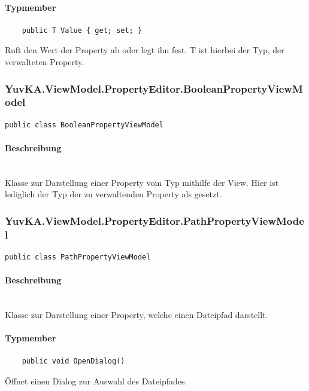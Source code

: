 \paragraph{Typmember}
\begin{itemize}

	\begin{verbatim}
	public T Value { get; set; }
	\end{verbatim}
	Ruft den Wert der Property ab oder legt ihn fest. T ist hierbei der Typ, der verwalteten Property.
\end{itemize}




\subsubsection{YuvKA.ViewModel.PropertyEditor.BooleanPropertyViewModel}

\begin{verbatim}
public class BooleanPropertyViewModel
\end{verbatim}

\paragraph{Beschreibung}~\\
Klasse zur Darstellung einer Property vom Typ  mithilfe der View. Hier ist lediglich der Typ der zu verwaltenden Property als  gesetzt.




\subsubsection{YuvKA.ViewModel.PropertyEditor.PathPropertyViewModel}

\begin{verbatim}
public class PathPropertyViewModel
\end{verbatim}

\paragraph{Beschreibung}~\\
Klasse zur Darstellung einer Property, welche einen Dateipfad darstellt.

\paragraph{Typmember}
\begin{itemize}

	\begin{verbatim}
	public void OpenDialog()
	\end{verbatim}
	Öffnet einen Dialog zur Auswahl des Dateipfades.

\end{itemize}




